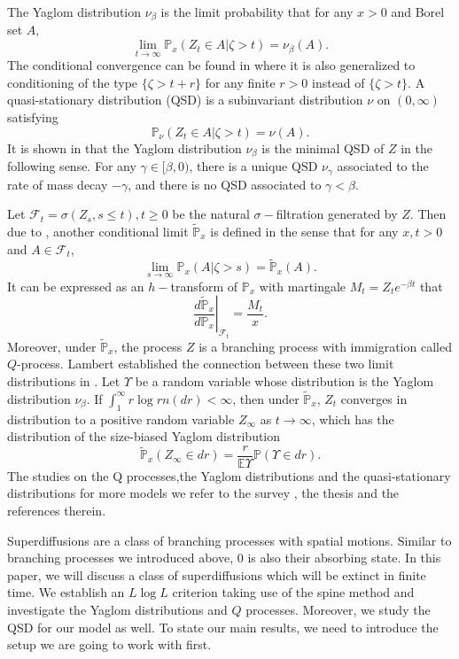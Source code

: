 \documentclass[12pt,a4paper]{amsart}
\numberwithin{equation}{section}
\theoremstyle{plain}
\theoremstyle{definition}
\begin{document}
The Yaglom distribution $\nu_{\beta}$ is the limit probability that for any
$x>0$ and Borel set $A$,
\[
	\lim_{t\rightarrow\infty}\mathbb P_x(Z_t\in A\big|\zeta>t)=\nu_{\beta}(A).
\]
The conditional convergence can be found in \cite{Li2000Asymptotic} where it is
also generalized to conditioning of the type $\{\zeta>t+r\}$ for any finite
$r>0$ instead of $\{\zeta>t\}$. A quasi-stationary distribution (QSD) is a
subinvariant distribution $\nu$ on $(0,\infty)$ satisfying
\[
	\mathbb P_{\nu}(Z_t\in A|\zeta>t)=\nu(A).
\]
It is shown in \cite{Lambert2007Quasistationary} that the Yaglom distribution
$\nu_{\beta}$ is the minimal QSD of $Z$ in the following sense. For any
$\gamma\in[\beta,0)$, there is a unique QSD $\nu_{\gamma}$ associated to the
rate of mass decay $-\gamma$, and there is no QSD associated to $\gamma<\beta$.


Let $\mathcal F_t=\sigma(Z_s,s\leq t), t\geq 0$ be the natural
$\sigma-$filtration generated by $Z$. Then due to
\cite{RenSongZhang2018Williams}, another conditional limit $\widetilde{\mathbb
  P}_x$ is defined in the sense that for any $x,t>0$ and $A\in\mathcal F_t$,
\[
	\lim_{s\rightarrow\infty}\mathbb P_x(A\big|\zeta>s)=\widetilde{\mathbb P}_x(A).
\]
It can be expressed as an $h-$transform of $\mathbb P_x$ with martingale
$M_t=Z_te^{-\beta t}$ that
\[
	\left.\dfrac{d\widetilde{\mathbb P}_x}{d\mathbb P_x}\right|_{\mathcal F_t}=\frac{M_t}{x}.
\]
Moreover, under $\widetilde{\mathbb P}_x$, the process $Z$ is a branching
process with immigration called $Q$-process. Lambert established the connection
between these two limit distributions in \cite{Lambert2007Quasistationary}. Let
$\Upsilon$ be a random variable whose distribution is the Yaglom distribution
$\nu_\beta$. If $\int_1^\infty r\log r n(dr)<\infty$, then under
$\widetilde{\mathbb P}_x$, $Z_t$ converges in distribution to a positive random
variable $Z_\infty$ as $t\to\infty$, which has the distribution of the
size-biased Yaglom distribution
\[
	\widetilde{\mathbb P}_x(Z_\infty\in dr)=\frac{r}{\mathbb E\Upsilon}\mathbb P(\Upsilon\in dr).
\]
The studies on the Q processes,the Yaglom distributions and the quasi-stationary
distributions for more models we refer to the survey
\cite{MeleardVillemonais2012Quasistationary}, the thesis
\cite{Penisson2010Conditional} and the references therein.

Superdiffusions are a class of branching processes with spatial motions. Similar
to branching processes we introduced above, $0$ is also their absorbing state.
In this paper, we will discuss a class of superdiffusions which will be extinct
in finite time. We establish an $L\log L$ criterion taking use of the spine
method and investigate the Yaglom distributions and $Q$ processes. Moreover, we
study the QSD for our model as well. To state our main results, we need to
introduce the setup we are going to work with first.
\end{document}
